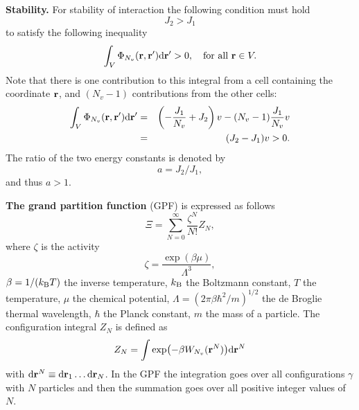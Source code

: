 \documentclass[12pt]{article}
\numberwithin{equation}{section}
\begin{document}
	\textbf{Stability.} For stability of interaction the following condition must hold
	\begin{equation*}
		J_2 > J_1
	\end{equation*}
	to satisfy the following inequality~\cite{KKD20,Ruelle70}
	\begin{equation}
		\int_{V} \Phi_{N_v}(\vb{r},\vb{r}') {\rm d} \vb{r}' > 0, \quad \text{for all } \vb{r} \in V.
	\end{equation}
	Note that there is one contribution to this integral from a cell containing the coordinate $\vb{r}$, and $(N_v - 1)$ contributions from the other cells:
	\begin{eqnarray*}
		\int_{V} \Phi_{N_v}(\vb{r},\vb{r}') {\rm d} \vb{r}' & = & \left(-\frac{J_1}{N_v} + J_2\right)v - (N_v - 1) \frac{J_1}{N_v}v
		\\
		& = & (J_2 - J_1)v > 0.
	\end{eqnarray*}
	The ratio of the two energy constants is denoted by
	$$a = J_2/J_1,$$
	and thus $a > 1.$
	
	\textbf{The grand partition function} (GPF) is expressed as follows~\cite[see eqs.~(2.4.6) and~(2.3.13)]{HansenMcDonald13}
	\begin{equation}\label{ZGR}
		\Xi=\sum_{N=0}^{\infty}\frac{\zeta^N}{N!}Z_N,
	\end{equation}
		where $\zeta$ is the activity
	\begin{equation*}
		\zeta = \frac{\exp(\beta \mu)}{\Lambda^3},
	\end{equation*}
	$\beta = 1/(k_{\rm B} T)$ the inverse temperature, $k_{\rm B}$ the Boltzmann constant, $T$ the temperature, $\mu$ the chemical potential, $\Lambda = (2\pi\beta\hbar^2/m)^{1/2}$ the de Broglie thermal wavelength, $\hbar$ the Planck constant, $m$ the mass of a particle. The configuration integral $Z_N$ is defined as
	\begin{equation}
		Z_N = \int\exp(-\beta W_{N_v}(\vb{r}^N)){\rm d}\vb{r}^N
	\end{equation}
	with ${\rm d} \vb{r}^N \equiv {\rm d}{\vb r_1} \dotsc {\rm d}{\vb r_N}$.
	In the GPF the integration goes over all configurations $\gamma$ with $N$ particles and then the summation goes over all positive integer values of $N$.
	
\end{document}
